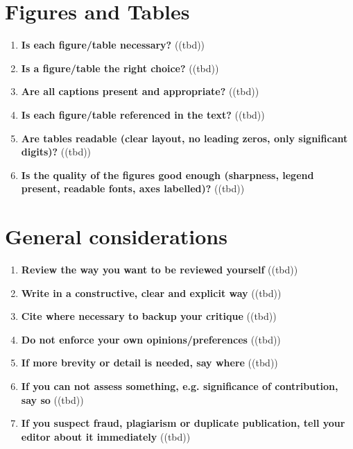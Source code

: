 \section{Figures and Tables}\label{sec:figures}
\begin{enumerate}[resume]
    \item \textbf{Is each figure/table necessary?} ((tbd))
    \item \textbf{Is a figure/table the right choice?} ((tbd))
    \item \textbf{Are all captions present and appropriate?} ((tbd))
    \item \textbf{Is each figure/table referenced in the text?} ((tbd))
    \item \textbf{Are tables readable (clear layout, no leading zeros, only significant digits)?} ((tbd))
    \item \textbf{Is the quality of the figures good enough (sharpness, legend present, readable fonts, axes labelled)?} ((tbd))
\end{enumerate}

\section{General considerations}\label{sec:considerations}
\begin{enumerate}[resume]
    \item \textbf{Review the way you want to be reviewed yourself} ((tbd))
    \item \textbf{Write in a constructive, clear and explicit way} ((tbd))
    \item \textbf{Cite where necessary to backup your critique} ((tbd))
    \item \textbf{Do not enforce your own opinions/preferences} ((tbd))
    \item \textbf{If more brevity or detail is needed, say where} ((tbd))
    \item \textbf{If you can not assess something, e.g. significance of contribution, say so} ((tbd))
    \item \textbf{If you suspect fraud, plagiarism or duplicate publication, tell your editor about it immediately} ((tbd))
\end{enumerate}

